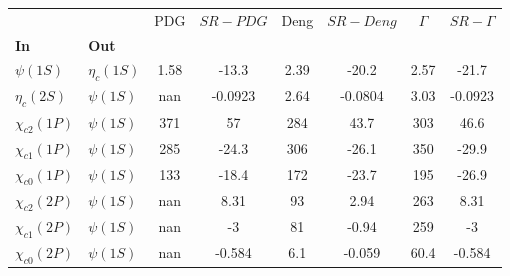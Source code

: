 \begin{tabular}{l|l|c|c|c|c|c|c}
\toprule
                &            &  PDG & $SR-PDG$ &  Deng & $SR-Deng$ &  $\Gamma$ & $SR-\Gamma$ \\
\textbf{In} & \textbf{Out} &      &          &       &           &           &             \\
\midrule
\textbf{$\psi(1S)$} & \textbf{$\eta_{c}(1S)$} & 1.58 &    -13.3 &  2.39 &     -20.2 &      2.57 &       -21.7 \\
\textbf{$\eta_{c}(2S)$} & \textbf{$\psi(1S)$} &  nan &  -0.0923 &  2.64 &   -0.0804 &      3.03 &     -0.0923 \\
\textbf{$\chi_{c2}(1P)$} & \textbf{$\psi(1S)$} &  371 &       57 &   284 &      43.7 &       303 &        46.6 \\
\textbf{$\chi_{c1}(1P)$} & \textbf{$\psi(1S)$} &  285 &    -24.3 &   306 &     -26.1 &       350 &       -29.9 \\
\textbf{$\chi_{c0}(1P)$} & \textbf{$\psi(1S)$} &  133 &    -18.4 &   172 &     -23.7 &       195 &       -26.9 \\
\textbf{$\chi_{c2}(2P)$} & \textbf{$\psi(1S)$} &  nan &     8.31 &    93 &      2.94 &       263 &        8.31 \\
\textbf{$\chi_{c1}(2P)$} & \textbf{$\psi(1S)$} &  nan &       -3 &    81 &     -0.94 &       259 &          -3 \\
\textbf{$\chi_{c0}(2P)$} & \textbf{$\psi(1S)$} &  nan &   -0.584 &   6.1 &    -0.059 &      60.4 &      -0.584 \\
\bottomrule
\end{tabular}
